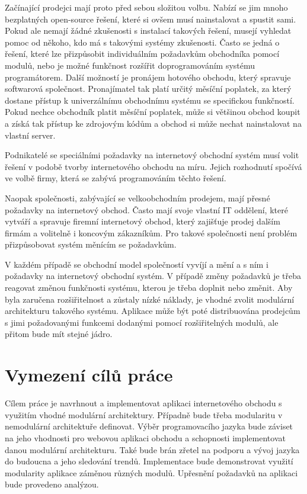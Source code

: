 \documentclass[11pt,twoside,a4paper]{book}
\begin{document}
Začínající prodejci mají proto před sebou složitou volbu. Nabízí se jim mnoho bezplatných open-source řešení, které si ovšem musí nainstalovat a spustit sami. Pokud ale nemají žádné zkušenosti s instalací takových řešení, musejí vyhledat pomoc od někoho, kdo má s takovými systémy zkušenosti. Často se jedná o řešení, které lze přizpůsobit individuálním požadavkům obchodníka pomocí modulů, nebo je možné funkčnost rozšířit doprogramováním systému programátorem. Další možností je pronájem hotového obchodu, který spravuje softwarová společnost. Pronajímatel tak platí určitý měsíční poplatek, za který dostane přístup k univerzálnímu obchodnímu systému se specifickou funkčností. Pokud nechce obchodník platit měsíční poplatek, může si většinou obchod koupit a získá tak přístup ke zdrojovým kódům a obchod si může nechat nainstalovat na vlastní server. 

Podnikatelé se speciálními požadavky na internetový obchodní systém musí volit řešení v podobě tvorby internetového obchodu na míru. Jejich rozhodnutí spočívá ve volbě firmy, která se zabývá programováním těchto řešení.

Naopak společnosti, zabývající se velkoobchodním prodejem, mají přesné požadavky na internetový obchod. Často mají svoje vlastní IT oddělení, které vytváří a spravuje firemní internetový obchod, který zajišťuje prodej dalším firmám a volitelně i koncovým zákazníkům. Pro takové společnosti není problém přizpůsobovat systém měnícím se požadavkům.

V každém případě se obchodní model společností vyvíjí a mění a s ním i požadavky na internetový obchodní systém. V případě změny požadavků je třeba reagovat změnou funkčnosti systému, kterou je třeba doplnit nebo změnit. Aby byla zaručena rozšiřitelnost a zůstaly nízké náklady, je vhodné zvolit modulární architekturu takového systému. Aplikace může být poté distribuována prodejcům s jimi požadovanými funkcemi dodanými pomocí rozšiřitelných modulů, ale přitom bude mít stejné jádro.

\section{Vymezení cílů práce}

Cílem práce je navrhnout a implementovat aplikaci internetového obchodu s využitím vhodné modulární architektury. Případně bude třeba modularitu v nemodulární architektuře definovat. Výběr programovacího jazyka bude záviset na jeho vhodnosti pro webovou aplikaci obchodu a schopnosti implementovat danou modulární architekturu. Také bude brán zřetel na podporu a vývoj jazyka do budoucna a jeho sledování trendů. Implementace bude demonstrovat využití modularity aplikace záměnou různých modulů. Upřesnění požadavků na aplikaci bude provedeno analýzou. 
\end{document}
